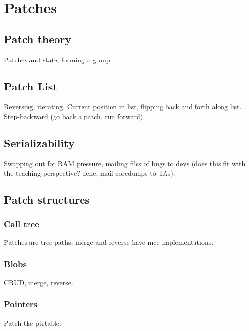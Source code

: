 \chapter{Patches}
\section{Patch theory}
Patches and state, forming a group
\section{Patch List}
Reversing, iterating. Current position in list, flipping back and
forth along list. Step-backward (go back a patch, run forward).
\section{Serializability}
Swapping out for RAM pressure, mailing files of bugs to devs (does
this fit with the teaching perspective? hehe, mail coredumps to TAs).
\section{Patch structures}
\subsection{Call tree}
Patches are tree-paths, merge and reverse have nice implementations.
\subsection{Blobs}
CRUD, merge, reverse.
\subsection{Pointers}
Patch the ptrtable.